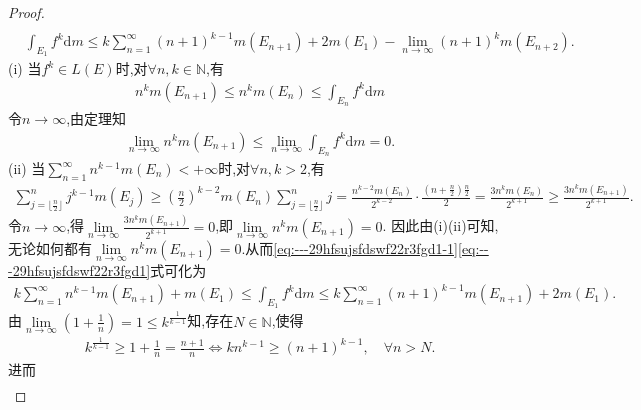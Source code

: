\documentclass[../../main.tex]{subfiles}%
\begin{document}
\begin{proof}
\begin{align}
\\
&\int_{E_1}{f^k\mathrm{d}m}\leqslant k\sum_{n=1}^{\infty}{\left( n+1 \right) ^{k-1}m\left( E_{n+1} \right)}+2m\left( E_1 \right) -\underset{n\rightarrow \infty}{\lim}\left( n+1 \right) ^km\left( E_{n+2} \right) .\label{eq:---29hfsujsfdswf22r3fgd1}
\end{align}
(i) 当$f^k\in L\left( E \right)$时,对$\forall n,k\in \mathbb{N}$,有
\begin{align*}
n^km\left( E_{n+1} \right) \leqslant n^km\left( E_n \right) \leqslant \int_{E_n}{f^k\mathrm{d}m}
\end{align*}
令$n\rightarrow \infty$,由定理知
\begin{align*}
\underset{n\rightarrow \infty}{\lim} n^km\left( E_{n+1} \right) \leqslant \underset{n\rightarrow \infty}{\lim} \int_{E_n}{f^k\mathrm{d}m}=0.
\end{align*}
(ii) 当$\sum_{n=1}^{\infty}{n^{k-1}m\left( E_n \right)}<+\infty$时,对$\forall n,k>2$,有
\begin{align*}
\sum_{j=\lfloor \frac{n}{2} \rfloor}^n{j^{k-1}m\left( E_j \right)}\geqslant \left( \frac{n}{2} \right) ^{k-2}m\left( E_n \right) \sum_{j=\lfloor \frac{n}{2} \rfloor}^n{j}=\frac{n^{k-2}m\left( E_n \right)}{2^{k-2}}\cdot \frac{\left( n+\frac{n}{2} \right) \frac{n}{2}}{2}=\frac{3n^km\left( E_n \right)}{2^{k+1}}\geqslant \frac{3n^km\left( E_{n+1} \right)}{2^{k+1}}.
\end{align*}
令$n\rightarrow \infty$,得$\underset{n\rightarrow \infty}{\lim} \frac{3n^km\left( E_{n+1} \right)}{2^{k+1}}=0$,即$\underset{n\rightarrow \infty}{\lim} n^km\left( E_{n+1} \right) =0$.
因此由(i)(ii)可知,无论如何都有$\underset{n\rightarrow \infty}{\lim} n^km\left( E_{n+1} \right) =0$.从而\eqref{eq:---29hfsujsfdswf22r3fgd1-1}\eqref{eq:---29hfsujsfdswf22r3fgd1}式可化为
\begin{align}
k\sum_{n=1}^{\infty}{n^{k-1}m\left( E_{n+1} \right)}+m\left( E_1 \right) \leqslant \int_{E_1}{f^k\mathrm{d}m}\leqslant k\sum_{n=1}^{\infty}{\left( n+1 \right) ^{k-1}m\left( E_{n+1} \right)}+2m\left( E_1 \right).\label{eq:---29hfsujsfdswf22r3fgd2}
\end{align}
由$\underset{n\rightarrow \infty}{\lim} \left( 1+\frac{1}{n} \right) =1\leqslant k^{\frac{1}{k-1}}$知,存在$N\in \mathbb{N}$,使得
\begin{align*}
k^{\frac{1}{k-1}}\geqslant 1+\frac{1}{n}=\frac{n+1}{n}\Longleftrightarrow kn^{k-1}\geqslant \left( n+1 \right) ^{k-1},\quad \forall n>N.
\end{align*}
进而
\begin{align*}

\end{align*}
\end{proof}
\end{document}
